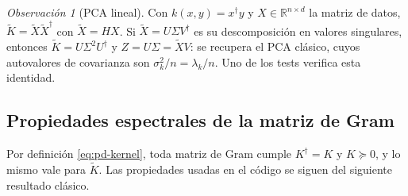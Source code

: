 \documentclass[11pt,a4paper]{article}
\newcommand{\R}{\mathbb{R}}
\newcommand{\dg}{\dagger}                         %
\newcommand{\Kc}{\widetilde{K}}                   %
\theoremstyle{plain}
\theoremstyle{definition}
\theoremstyle{remark}
\newtheorem{observacion}[teorema]{Observación}
\numberwithin{equation}{section}
\begin{document}
\begin{observacion}[PCA lineal]
Con $k(x,y)=x^{\dg}y$ y $X\in\R^{n\times d}$ la matriz de datos, $\Kc=\tilde X\tilde X^{\dg}$
con $\tilde X=HX$. Si $\tilde X=U\Sigma V^{\dg}$ es su descomposición en valores singulares,
entonces $\Kc=U\Sigma^2U^{\dg}$ y $Z=U\Sigma=\tilde XV$: se recupera el PCA clásico, cuyos
autovalores de covarianza son $\sigma_k^2/n=\lambda_k/n$. Uno de los tests verifica esta
identidad.
\end{observacion}

\subsection{Propiedades espectrales de la matriz de Gram}\label{sec:espectral}

Por definición \eqref{eq:pd-kernel}, toda matriz de Gram cumple $K^{\dg}=K$ y $K\succeq0$,
y lo mismo vale para $\Kc$. Las propiedades usadas en el código se siguen del siguiente
resultado clásico.
\end{document}
